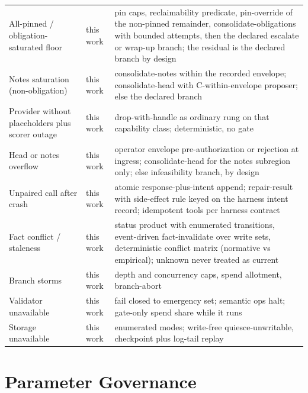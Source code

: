 \documentclass[11pt]{article}
\begin{document}
{\begin{longtable}{@{}p{3.4cm}p{3.9cm}p{7.2cm}@{}}
All-pinned / obligation-saturated floor & this work & pin caps, reclaimability predicate, pin-override of the non-pinned remainder, consolidate-obligations with bounded attempts, then the declared escalate or wrap-up branch; the residual is the declared branch by design \\
Notes saturation (non-obligation) & this work & consolidate-notes within the recorded envelope; consolidate-head with C-within-envelope proposer; else the declared branch \\
Provider without placeholders plus scorer outage & this work & drop-with-handle as ordinary rung on that capability class; deterministic, no gate \\
Head or notes overflow & this work & operator envelope pre-authorization or rejection at ingress; consolidate-head for the notes subregion only; else infeasibility branch, by design \\
Unpaired call after crash & this work & atomic response-plus-intent append; repair-result with side-effect rule keyed on the harness intent record; idempotent tools per harness contract \\
Fact conflict / staleness & this work & status product with enumerated transitions, event-driven fact-invalidate over write sets, deterministic conflict matrix (normative vs empirical); unknown never treated as current \\
Branch storms & this work & depth and concurrency caps, spend allotment, branch-abort \\
Validator unavailable & this work & fail closed to emergency set; semantic ops halt; gate-only spend share while it runs \\
Storage unavailable & this work & enumerated modes; write-free quiesce-unwritable, checkpoint plus log-tail replay \\
\bottomrule
\end{longtable}
}

\section{Parameter Governance}
\label{sec:params}
\end{document}
